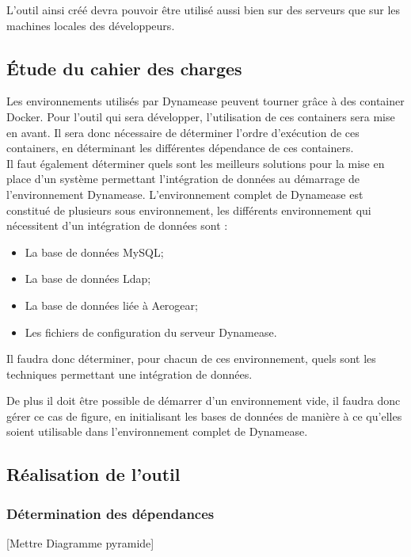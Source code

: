 L'outil ainsi créé devra pouvoir être utilisé aussi bien sur des serveurs que sur les machines locales des développeurs. 

\subsection{Étude du cahier des charges}

Les environnements utilisés par Dynamease peuvent tourner grâce à des container Docker. Pour l'outil qui sera développer, l'utilisation de ces containers sera mise en avant. Il sera donc nécessaire de déterminer l'ordre d'exécution de ces containers, en déterminant les différentes dépendance de ces containers.\\

Il faut également déterminer quels sont les meilleurs solutions pour la mise en place d'un système permettant l'intégration de données au démarrage de l'environnement Dynamease. L'environnement complet de Dynamease est constitué de plusieurs sous environnement, les différents environnement qui nécessitent d'un intégration de données sont :

\begin{itemize}
	\item La base de données MySQL;
	\item La base de données Ldap;
	\item La base de données liée à Aerogear;
	\item Les fichiers de configuration du serveur Dynamease.
\end{itemize}

Il faudra donc déterminer, pour chacun de ces environnement, quels sont les techniques permettant une intégration de données.

De plus il doit être possible de démarrer d'un environnement vide, il faudra donc gérer ce cas de figure, en initialisant les bases de données de manière à ce qu'elles soient utilisable dans l'environnement complet de Dynamease.

\subsection{Réalisation de l'outil}

\subsubsection{Détermination des dépendances}

[Mettre Diagramme pyramide]

